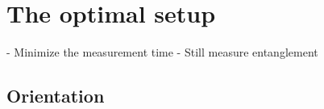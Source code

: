 \section{The optimal setup}\label{sec:4:optimal-setup}

- Minimize the measurement time
- Still measure entanglement


\subsection{Orientation}





